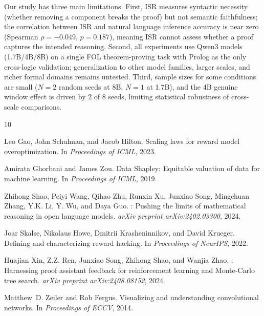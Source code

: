 \documentclass[11pt,a4paper]{article}
\begin{document}
Our study has three main limitations.
First, ISR measures syntactic necessity (whether removing a component breaks the proof) but not semantic faithfulness; the correlation between ISR and natural language inference accuracy is near zero (Spearman $\rho=-0.049$, $p=0.187$), meaning ISR cannot assess whether a proof captures the intended reasoning.
Second, all experiments use Qwen3 models (1.7B/4B/8B) on a single FOL theorem-proving task with Prolog as the only cross-logic validation; generalization to other model families, larger scales, and richer formal domains remains untested.
Third, sample sizes for some conditions are small ($N{=}2$ random seeds at 8B, $N{=}1$ at 1.7B), and the 4B genuine window effect is driven by 2 of 8 seeds, limiting statistical robustness of cross-scale comparisons.


\begin{thebibliography}{10}

Leo Gao, John Schulman, and Jacob Hilton.
\newblock Scaling laws for reward model overoptimization.
\newblock In \emph{Proceedings of ICML}, 2023.

Amirata Ghorbani and James Zou.
\newblock Data {S}hapley: Equitable valuation of data for machine learning.
\newblock In \emph{Proceedings of ICML}, 2019.

Zhihong Shao, Peiyi Wang, Qihao Zhu, Runxin Xu, Junxiao Song, Mingchuan Zhang, Y.K. Li, Y. Wu, and Daya Guo.
: Pushing the limits of mathematical reasoning in open language models.
\newblock \emph{arXiv preprint arXiv:2402.03300}, 2024.

Joar Skalse, Nikolaus Howe, Dmitrii Krasheninnikov, and David Krueger.
\newblock Defining and characterizing reward hacking.
\newblock In \emph{Proceedings of NeurIPS}, 2022.

Huajian Xin, Z.Z. Ren, Junxiao Song, Zhihong Shao, and Wanjia Zhao.
: Harnessing proof assistant feedback for reinforcement learning and {Monte-Carlo} tree search.
\newblock \emph{arXiv preprint arXiv:2408.08152}, 2024.

Matthew~D. Zeiler and Rob Fergus.
\newblock Visualizing and understanding convolutional networks.
\newblock In \emph{Proceedings of ECCV}, 2014.

\end{thebibliography}
\end{document}
